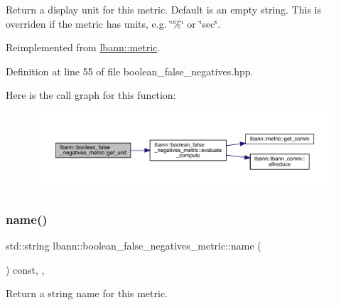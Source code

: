 Return a display unit for this metric. Default is an empty string. This is overriden if the metric has units, e.\+g. \char`\"{}\%\char`\"{} or \char`\"{}sec\char`\"{}. 

Reimplemented from \hyperlink{classlbann_1_1metric_a13fd302dec85190b877f7146529e516c}{lbann\+::metric}.



Definition at line 55 of file boolean\+\_\+false\+\_\+negatives.\+hpp.


Here is the call graph for this function\+:\nopagebreak
\begin{figure}[H]
\begin{center}
\leavevmode
\includegraphics[width=350pt]{classlbann_1_1boolean__false__negatives__metric_abe2bdb0c15ff481caa234e13fe7df2b9_cgraph}
\end{center}
\end{figure}
\mbox{\label{classlbann_1_1boolean__false__negatives__metric_a7e7f60e7babfbaad2dce5def175a8fbd}} 
\subsubsection{\texorpdfstring{name()}{name()}}
{\footnotesize\ttfamily std\+::string lbann\+::boolean\+\_\+false\+\_\+negatives\+\_\+metric\+::name (\begin{DoxyParamCaption}{ }\end{DoxyParamCaption}) const\hspace{0.3cm}{\ttfamily [inline]}, {\ttfamily [override]}, {\ttfamily [virtual]}}

Return a string name for this metric. 

